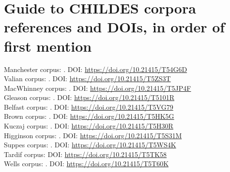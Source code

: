 \documentclass[output=paper,colorlinks,citecolor=brown]{langscibook}
\begin{document}
\section*{Guide to CHILDES corpora references and DOIs, in order of first mention}
Manchester corpus: \citet{theakstonetal2001}. DOI: \url{https://doi.org/10.21415/T54G6D}\\ 
Valian corpus: \citet{valian1991}. DOI: \url{https://doi.org/10.21415/T5ZS3T} \\
MacWhinney corpus: \citet{macwhin1991}. DOI: \url{https://doi.org/10.21415/T5JP4F}\\   
Gleason corpus: \citet{masurberko1980}. DOI: \url{https://doi.org/10.21415/T5101R}\\ 
Belfast corpus: \citet{henry1995}. DOI: \url{https://doi.org/10.21415/T5VG79}  \\
Brown corpus: \citet{brown1973}. DOI: \url{https://doi.org/10.21415/T5HK5G} \\
Kuczaj corpus: \citet{kuczaj1977}. DOI: \url{https://doi.org/10.21415/T5H30R} \\
Higginson corpus: \citet{higg1985}. DOI: \url{https://doi.org/10.21415/T5S31M}\\ 
Suppes corpus: \citet{suppes1974}. DOI: \url{https://doi.org/10.21415/T5WS4K} \\
Tardif corpus: DOI: \url{https://doi.org/10.21415/T5TK58}  \\
Wells corpus: \citet{wells1981}. DOI: \url{https://doi.org/10.21415/T5T60K}


\sloppy
\printbibliography[heading=subbibliography,notkeyword=this]
\end{document}
